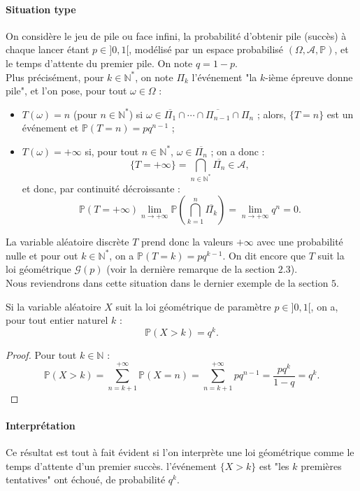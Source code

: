 \documentclass[french]{article}
\renewcommand{\P}{\mathbb{P}}
\newcommand{\N}{\mathbb{N}}
\newcommand{\st}{^*}
\theoremstyle{plain}
\theoremstyle{definition}
\theoremstyle{remark}
\begin{document}
\paragraph{Situation type}
On considère le jeu de pile ou face infini, la probabilité d'obtenir pile (succès) à chaque lancer étant $p\in]0,1[$, modélisé par un espace probabilisé $(\Omega,\mathcal{A},\P)$, et le temps d'attente du premier pile. On note $q=1-p$. \\
Plus précisément, pour $k\in\N\st$, on note $\Pi_k$ l'événement "la $k$-ième épreuve donne pile", et l'on pose, pour tout $\omega\in\Omega$ :
\begin{itemize}
	\item $T(\omega)=n$ (pour $n\in\N\st$) si $\omega\in\overline{\Pi_1}\cap\cdots\cap\overline{\Pi_{n-1}}\cap\Pi_n$ ; alors, $\{T=n\}$ est un événement et $\P(T=n)=pq^{n-1}$ ;
	\item $T(\omega)=+\infty$ si, pour tout $n\in\N\st$, $\omega\in\overline{\Pi_n}$ ; on a donc :
	$$\{T=+\infty\}=\bigcap_{n\in\N\st}\overline{\Pi_n}\in\mathcal{A},$$ et donc, par continuité décroissante :
	$$\P(T=+\infty)\underset{n\to+\infty}{\lim}\P\left(\bigcap_{k=1}^n\overline{\Pi_k}\right)=\underset{n\to+\infty}{\lim}q^n=0.$$
\end{itemize}
La variable aléatoire discrète $T$ prend donc la valeurs $+\infty$ avec une probabilité nulle et pour out $k\in\N\st$, on a $\P(T=k)=pq^{k-1}$. On dit encore que $T$ suit la loi géométrique $\mathcal{G}(p)$ (voir la dernière remarque de la section $2.3$).\\
Nous reviendrons dans cette situation dans le dernier exemple de la section $5$.

\begin{thm}{}%
	Si la variable aléatoire $X$ suit la loi géométrique de paramètre $p\in]0,1[$, on a, pour tout entier naturel $k$ : 
	$$\P(X>k)=q^k.$$
\end{thm}
\begin{proof}
	Pour tout $k\in\N$ :
	$$\P(X>k)=\sum_{n=k+1}^{+\infty}\P(X=n)=\sum_{n=k+1}^{+\infty}pq^{n-1}=\frac{pq^k}{1-q}=q^k.$$
\end{proof}

\paragraph{Interprétation} Ce résultat est tout à fait évident si l'on interprète une loi géométrique comme le temps d'attente d'un premier succès. l'événement $\{X>k\}$ est "les $k$ premières tentatives" ont échoué, de probabilité $q^k$.
\end{document}
